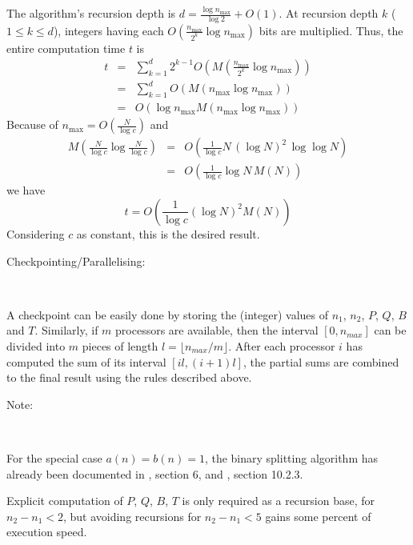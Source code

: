 The algorithm's recursion depth is  \( d=\frac{\log n_{\max }}{\log 2}+O(1) \).
At recursion depth  \( k \) (\( 1\leq k\leq d \)), integers having each
\( O(\frac{n_{\max }}{2^{k}}\log n_{\max }) \) bits are multiplied. Thus,
the entire computation time \( t \) is
\begin{eqnarray*}
t &=& \sum ^{d}_{k=1}
2^{k-1}O\left( M\left( \frac{n_{\max }}{2^{k}}\log n_{\max }\right)\right)\\
&=& \sum ^{d}_{k=1} O\left( M\left( n_{\max }\log n_{\max }\right) \right)\\
&=& O(\log n_{\max }M(n_{\max }\log n_{\max }))
\end{eqnarray*}
Because of  \( n_{\max }=O( \frac{N}{\log c}) \) and
\begin{eqnarray*}
M\left(\frac{N}{\log c} \log \frac{N}{\log c}\right)
&=& O\left(\frac{1}{\log c} N\, (\log N)^{2}\, \log \log N\right)\\
&=& O\left(\frac{1}{\log c} \log N\, M(N)\right)
\end{eqnarray*}
we have
\[ t = O\left(\frac{1}{\log c} (\log N)^{2}M(N)\right) \]
Considering \(c\) as constant, this is the desired result.

\begin{description}
\item [Checkpointing/Parallelising:]~
\end{description}

A checkpoint can be easily done by storing the (integer) values of
\( n_1 \),  \( n_2 \), \( P \),  \( Q \),  \( B \) and \( T \).
Similarly, if \( m \) processors are available, then the interval 
\( [0,n_{max}] \) can be divided into \( m \) pieces of length 
\( l = \lfloor n_{max}/m \rfloor \). After each processor \( i \) has
computed the sum of its interval \( [il,(i+1)l] \), the partial sums are
combined to the final result using the rules described above.

\begin{description}
\item [Note:]~
\end{description}

For the special case  \( a(n)=b(n)=1 \), the binary splitting algorithm has
already been documented in \cite{76a}, section 6, and \cite{87}, section 10.2.3.

Explicit computation of  \( P \),  \( Q \),  \( B \),  \( T \) is only required
as a recursion base, for  \( n_{2}-n_{1}<2 \), but avoiding recursions for
\( n_{2}-n_{1}<5 \) gains some percent of execution speed.

